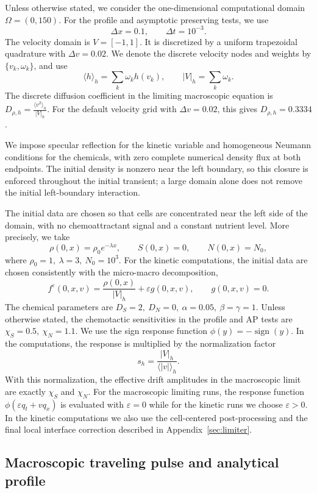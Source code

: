 \documentclass[11pt,twoside]{article}
\numberwithin{equation}{section}
\theoremstyle{plain}
\theoremstyle{nonumberplain}
\newif\ifrevisionred
\DeclareRobustCommand{\st}[1]{{\ifrevisionred\color{red}\fi #1}}
\begin{document}
{Unless otherwise stated, we consider the one-dimensional computational
domain \(\Omega=(0,150)\). For the profile and asymptotic preserving
tests, we use
\[
\Delta x=0.1,
\qquad
\Delta t=10^{-3}.
\]
The velocity domain is \(V=[-1,1]\). It is discretized by a uniform
trapezoidal quadrature with \(\Delta v=0.02\). We denote the discrete
velocity nodes and weights by \(\{v_k,\omega_k\}\), and use
\[
\langle h\rangle_h=\sum_k\omega_k h(v_k),
\qquad
|V|_h=\sum_k\omega_k .
\]
The discrete diffusion coefficient in the limiting macroscopic equation
is
 $D_{\rho,h}
=
\frac{\langle v^2\rangle_h}{|V|_h}.$
For the default velocity grid with \(\Delta v=0.02\), this gives
\(D_{\rho,h}=0.3334\).

\st{We impose specular reflection for the kinetic variable and homogeneous Neumann conditions for the chemicals, with zero complete numerical density flux at both endpoints. The initial density is nonzero near the left boundary, so this closure is enforced throughout the initial transient; a large domain alone does not remove the initial left-boundary interaction.}

The initial data are chosen so that cells are concentrated near the left
side of the domain, with no chemoattractant signal and a constant
nutrient level. More precisely, we take
\[
\rho(0,x)=\rho_0 e^{-\lambda x},
\qquad
S(0,x)=0,
\qquad
N(0,x)=N_0,
\]
where
$\rho_0=1,
\
\lambda=3,
\
N_0=10^3 .$
For the kinetic computations, the initial data are chosen consistently
with the micro-macro decomposition,
\[
f^\varepsilon(0,x,v)
=
\frac{\rho(0,x)}{|V|_h}
+
\varepsilon g(0,x,v),
\qquad
g(0,x,v)=0 .
\]
The chemical parameters are
$
D_S=2,
\
D_N=0,
\
\alpha=0.05,
\
\beta=\gamma=1 .
$
Unless otherwise stated, the chemotactic sensitivities in the profile
and AP tests are
$\chi_S=0.5,
\
\chi_N=1.1 .$
We use the sign response function
$
\phi(y)=-\operatorname{sign}(y).$
In the computations, the response is multiplied by the normalization
factor
\[
s_h=\frac{|V|_h}{\langle |v|\rangle_h}.
\]
With this normalization, the effective drift amplitudes in the
macroscopic limit are exactly \(\chi_S\) and \(\chi_N\). For the
macroscopic limiting runs, the response function \(\phi(\varepsilon q_t+vq_x)\) is evaluated with $\varepsilon=0$ while for the kinetic runs we choose \(\varepsilon>0\). In the kinetic computations we also use
\st{the cell-centered post-processing and the final local interface correction described in Appendix~\ref{sec:limiter}.}

\subsection{Macroscopic traveling pulse and analytical profile}

}
\end{document}
